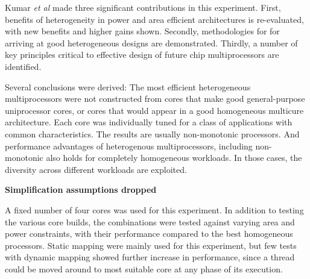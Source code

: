 Kumar \textit{et al} made three significant contributions in this experiment. 
First, benefits of heterogeneity in power and area efficient architectures is re-evaluated, with new benefits and higher gains shown.
Secondly, methodologies for for arriving at good heterogeneous designs are demonstrated.
Thirdly, a number of key principles critical to effective design of future chip multiprocessors are identified.

Several conclusions were derived:
The most efficient heterogeneous multiprocessors were not constructed from cores that make good general-purpose uniprocessor cores, or cores that would appear in a good homogeneous multicure architecture.
Each core was individually tuned for a class of applications with common characteristics.
The results are usually non-monotonic processors.
And performance advantages of heterogenous multiprocessors, including non-monotonic also holds for completely homogeneous workloads.
In those cases, the diversity across different workloads are exploited.

\textbf{Simplification assumptions dropped}


A fixed number of four cores was used for this experiment.
In addition to testing the various core builds, the combinations were tested against varying area and power constraints, with their performance compared to the best homogeneous processors.
Static mapping were mainly used for this experiment, but few tests with dynamic mapping showed further increase in performance, since a thread could be moved around to most suitable core at any phase of its execution. 



